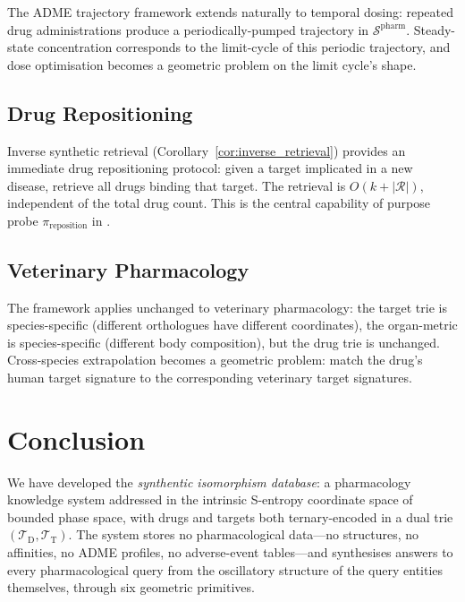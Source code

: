 \documentclass[11pt,twocolumn,a4paper]{article}
\theoremstyle{definition}
\theoremstyle{remark}
\newcommand{\Sspace}{\mathcal{S}}
\newcommand{\Trie}{\mathcal{T}}
\newcommand{\Dtrie}{\Trie_{\mathrm{D}}}
\newcommand{\Ttrie}{\Trie_{\mathrm{T}}}
\begin{document}
The ADME trajectory framework extends naturally to temporal dosing: repeated drug administrations produce a periodically-pumped trajectory in $\Sspace^{\mathrm{pharm}}$. Steady-state concentration corresponds to the limit-cycle of this periodic trajectory, and dose optimisation becomes a geometric problem on the limit cycle's shape.

\subsection{Drug Repositioning}

Inverse synthetic retrieval (Corollary~\ref{cor:inverse_retrieval}) provides an immediate drug repositioning protocol: given a target implicated in a new disease, retrieve all drugs binding that target. The retrieval is $O(k + |\mathcal{R}|)$, independent of the total drug count. This is the central capability of purpose probe $\pi_{\mathrm{reposition}}$ in \citep{sachikonye2025g}.

\subsection{Veterinary Pharmacology}

The framework applies unchanged to veterinary pharmacology: the target trie is species-specific (different orthologues have different coordinates), the organ-metric is species-specific (different body composition), but the drug trie is unchanged. Cross-species extrapolation becomes a geometric problem: match the drug's human target signature to the corresponding veterinary target signatures.

\section{Conclusion}
\label{sec:conclusion}

We have developed the \emph{synthentic isomorphism database}: a pharmacology knowledge system addressed in the intrinsic S-entropy coordinate space of bounded phase space, with drugs and targets both ternary-encoded in a dual trie $(\Dtrie, \Ttrie)$. The system stores no pharmacological data---no structures, no affinities, no ADME profiles, no adverse-event tables---and synthesises answers to every pharmacological query from the oscillatory structure of the query entities themselves, through six geometric primitives.
\end{document}
